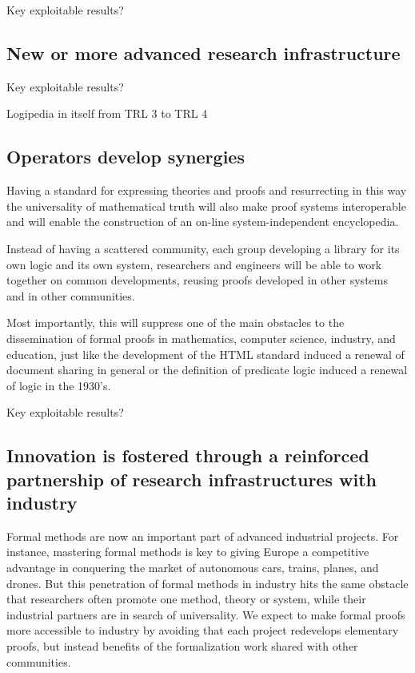 {\color{red} Key exploitable results?}

\subsection{New or more advanced research infrastructure}

{\color{red} Key exploitable results?}

Logipedia in itself from TRL 3 to TRL 4


\subsection{Operators develop synergies}

Having a standard for expressing theories and proofs and resurrecting
in this way the universality of mathematical truth will also make proof
systems interoperable and will enable the construction of an on-line
system-independent encyclopedia.

Instead of having a scattered community, each group developing a
library for its own logic and its own system, researchers and
engineers will be able to work together on common developments,
reusing proofs developed in other systems and in other communities.

Most importantly, this will suppress one of the main obstacles to the
dissemination of formal proofs in mathematics, computer science, industry,
and education, just like the development of the HTML standard induced
a renewal of document sharing in general or the definition of
predicate logic induced a renewal of logic in the 1930's.


{\color{red} Key exploitable results?}


\subsection{Innovation is fostered through a reinforced partnership of research
infrastructures with industry}

Formal methods are now an important part of advanced
industrial projects. For instance, mastering formal methods is key to
giving Europe a competitive advantage in conquering the market of
autonomous cars, trains, planes, and drones. But this penetration of
formal methods in industry hits the same obstacle that researchers
often promote one method, theory or system, while their industrial
partners are in search of universality. We expect to make formal
proofs more accessible to industry by avoiding that each project
redevelops elementary proofs, but instead benefits of the formalization
work shared with other communities.

